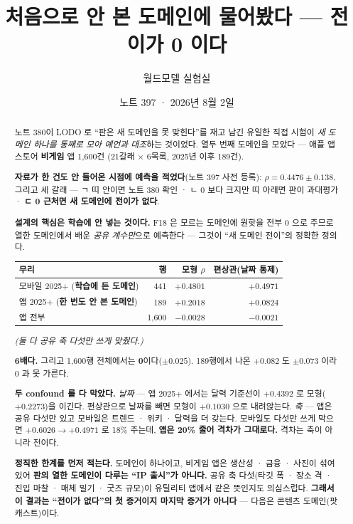 \documentclass[11pt]{article}
\begin{document}
\title{처음으로 안 본 도메인에 물어봤다 --- 전이가 0 이다}
\author{월드모델 실험실}
\date{노트 397 · 2026년 8월 2일}
\maketitle

\begin{abstract}
노트 380이 LODO 로 ``판은 새 도메인을 못 맞힌다''를 재고 남긴 유일한 직접
시험이 \emph{새 도메인 하나를 통째로 모아 예언과 대조}하는 것이었다.
열두 번째 도메인을 모았다 --- 애플 앱스토어 \textbf{비게임} 앱 1,600건
(21갈래 $\times$ 6목록, 2025년 이후 189건).

\textbf{자료가 한 건도 안 들어온 시점에 예측을 적었다}(노트 397 사전 등록):
$\rho = 0.4476 \pm 0.138$, 그리고 세 갈래 --- ㄱ 띠 안이면 노트 380 확인 ·
ㄴ 0 보다 크지만 띠 아래면 판이 과대평가 · \textbf{ㄷ 0 근처면 새 도메인에
전이가 없다}.

\textbf{설계의 핵심은 학습에 안 넣는 것이다.} F18 은 모르는 도메인에
원핫을 전부 0 으로 주므로 열한 도메인에서 배운 \emph{공유 계수만}으로
예측한다 --- 그것이 ``새 도메인 전이''의 정확한 정의다.

\begin{center}
\begin{tabular}{lrrr}
\hline
무리 & 행 & 모형 $\rho$ & 편상관(날짜 통제) \\
\hline
모바일 2025$+$ (\textbf{학습에 든 도메인}) & 441 & $+0.4801$ & $\mathbf{+0.4971}$ \\
앱 2025$+$ (\textbf{한 번도 안 본 도메인}) & 189 & $+0.2018$ & $\mathbf{+0.0824}$ \\
앱 전부 & 1,600 & $-0.0028$ & $\mathbf{-0.0021}$ \\
\hline
\end{tabular}
\end{center}
\emph{(둘 다 공유 축 다섯만 쓰게 맞췄다.)}

\textbf{6배다.} 그리고 1,600행 전체에서는 \textbf{0}이다($\pm0.025$).
189행에서 나온 $+0.082$ 도 $\pm0.073$ 이라 0 과 못 가른다.

\textbf{두 confound 를 다 막았다.} \emph{날짜} --- 앱 2025$+$ 에서는
달력 기준선이 $+0.4392$ 로 모형($+0.2273$)을 이긴다. 편상관으로 날짜를
빼면 모형이 $+0.1030$ 으로 내려앉는다. \emph{축} --- 앱은 공유 다섯만
있고 모바일은 트렌드 · 위키 · 달력을 더 갖는다. 모바일도 다섯만 쓰게
막으면 $+0.6026 \to +0.4971$ 로 18\% 주는데, \textbf{앱은 20\% 줄어
격차가 그대로다.} 격차는 축이 아니라 전이다.

\textbf{정직한 한계를 먼저 적는다.} 도메인이 하나이고, 비게임 앱은
생산성 · 금융 · 사진이 섞여 있어 \textbf{판의 열한 도메인이 다루는 ``IP
출시''가 아니다.} 공유 축 다섯(타깃 폭 · 장소 격 · 진입 마찰 · 매체 밀기 ·
굿즈 규모)이 유틸리티 앱에서 같은 뜻인지도 의심스럽다. \textbf{그래서 이
결과는 ``전이가 없다''의 첫 증거이지 마지막 증거가 아니다} --- 다음은
콘텐츠 도메인(팟캐스트)이다.
\end{abstract}
\end{document}
